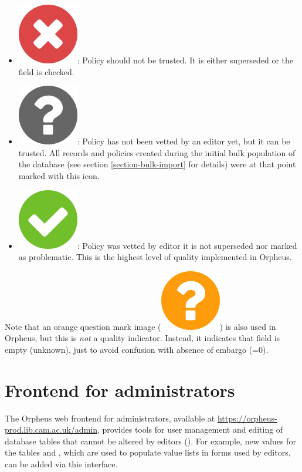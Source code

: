 \documentclass[british, 12pt]{article}
\begin{document}
\begin{itemize}
  \item \includegraphics{icon-no}: Policy should not be trusted. It is either superseded or the field  is checked.
  \item \includegraphics{icon-unknown}: Policy has not been vetted by an editor yet, but it can be trusted. All records and policies created during the initial bulk population of the database (see section \vref{section-bulk-import} for details) were at that point marked with this icon.
  \item \includegraphics{icon-yes}: Policy was vetted by editor it is not superseded nor marked as problematic. This is the highest level of quality implemented in Orpheus.
\end{itemize}

\begin{warn}
  Note that an orange question mark image (\includegraphics{icon-unknown-orange}) is also used in Orpheus, but this is \emph{not} a quality indicator. Instead, it indicates that field  is empty (unknown), just to avoid confusion with absence of embargo (=0). 
\end{warn}

\section{Frontend for administrators}
\label{sec-frontend-for-administrators}
The Orpheus web frontend for administrators, available at \url{https://orpheus-prod.lib.cam.ac.uk/admin}, provides tools for user management and editing of database tables that cannot be altered by editors (). For example, new values for the tables  and , which are used to populate value lists in forms used by editors, can be added via this interface.
\end{document}
